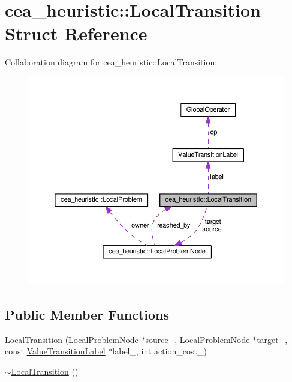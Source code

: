 \hypertarget{structcea__heuristic_1_1LocalTransition}{\section{cea\-\_\-heuristic\-:\-:Local\-Transition Struct Reference}
\label{structcea__heuristic_1_1LocalTransition}
}


Collaboration diagram for cea\-\_\-heuristic\-:\-:Local\-Transition\-:
\nopagebreak
\begin{figure}[H]
\begin{center}
\leavevmode
\includegraphics[width=350pt]{structcea__heuristic_1_1LocalTransition__coll__graph}
\end{center}
\end{figure}
\subsection*{Public Member Functions}
\begin{DoxyCompactItemize}
\item 
\hyperlink{structcea__heuristic_1_1LocalTransition_a35652ea62e24e3ee86fb64a79de917a3}{Local\-Transition} (\hyperlink{structcea__heuristic_1_1LocalProblemNode}{Local\-Problem\-Node} $\ast$source\-\_\-, \hyperlink{structcea__heuristic_1_1LocalProblemNode}{Local\-Problem\-Node} $\ast$target\-\_\-, const \hyperlink{structValueTransitionLabel}{Value\-Transition\-Label} $\ast$label\-\_\-, int action\-\_\-cost\-\_\-)
\item 
\hyperlink{structcea__heuristic_1_1LocalTransition_a0515369e1a8d8c02e9cbebe510a2fe80}{$\sim$\-Local\-Transition} ()
\end{DoxyCompactItemize}
